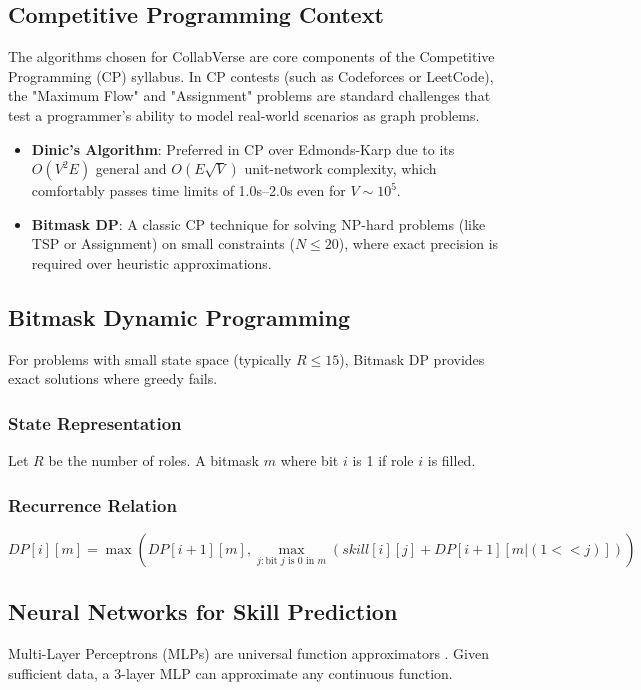 \documentclass[12pt,a4paper]{article}
\begin{document}
\subsection{Competitive Programming Context}
The algorithms chosen for CollabVerse are core components of the Competitive Programming (CP) syllabus. In CP contests (such as Codeforces or LeetCode), the "Maximum Flow" and "Assignment" problems are standard challenges that test a programmer's ability to model real-world scenarios as graph problems.

\begin{itemize}
    \item \textbf{Dinic's Algorithm}: Preferred in CP over Edmonds-Karp due to its $O(V^2 E)$ general and $O(E\sqrt{V})$ unit-network complexity, which comfortably passes time limits of 1.0s--2.0s even for $V \sim 10^5$.
    \item \textbf{Bitmask DP}: A classic CP technique for solving NP-hard problems (like TSP or Assignment) on small constraints ($N \leq 20$), where exact precision is required over heuristic approximations.
\end{itemize}

\subsection{Bitmask Dynamic Programming}
For problems with small state space (typically \( R \leq 15 \)), Bitmask DP provides exact solutions where greedy fails.

\subsubsection{State Representation}
Let \( R \) be the number of roles. A bitmask \( m \) where bit \( i \) is 1 if role \( i \) is filled.

\subsubsection{Recurrence Relation}
\[
DP[i][m] = \max(DP[i+1][m], \max_{j: \text{bit }j\text{ is 0 in } m} (skill[i][j] + DP[i+1][m | (1 << j)]))
\]

\subsection{Neural Networks for Skill Prediction}
Multi-Layer Perceptrons (MLPs) are universal function approximators \cite{goodfellow2016}. Given sufficient data, a 3-layer MLP can approximate any continuous function.
\end{document}

